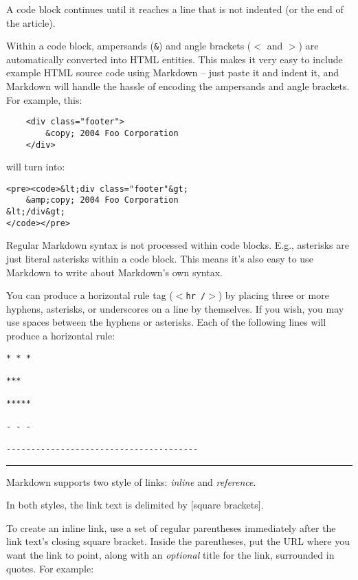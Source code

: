 A code block continues until it reaches a line that is not indented
(or the end of the article).

Within a code block, ampersands (\texttt{\&}) and angle brackets (\texttt{$<$} and \texttt{$>$})
are automatically converted into HTML entities. This makes it very
easy to include example HTML source code using Markdown -- just paste
it and indent it, and Markdown will handle the hassle of encoding the
ampersands and angle brackets. For example, this:

\begin{verbatim}
    <div class="footer">
        &copy; 2004 Foo Corporation
    </div>
\end{verbatim}

will turn into:

\begin{verbatim}
<pre><code>&lt;div class="footer"&gt;
    &amp;copy; 2004 Foo Corporation
&lt;/div&gt;
</code></pre>
\end{verbatim}

Regular Markdown syntax is not processed within code blocks. E.g.,
asterisks are just literal asterisks within a code block. This means
it's also easy to use Markdown to write about Markdown's own syntax.

You can produce a horizontal rule tag (\texttt{$<$hr \slash $>$}) by placing three or
more hyphens, asterisks, or underscores on a line by themselves. If you
wish, you may use spaces between the hyphens or asterisks. Each of the
following lines will produce a horizontal rule:

\begin{verbatim}
* * *

***

*****

- - -

---------------------------------------
\end{verbatim}

\begin{center}\rule{3in}{0.4pt}\end{center}

Markdown supports two style of links: \emph{inline} and \emph{reference}.

In both styles, the link text is delimited by [square brackets].

To create an inline link, use a set of regular parentheses immediately
after the link text's closing square bracket. Inside the parentheses,
put the URL where you want the link to point, along with an \emph{optional}
title for the link, surrounded in quotes. For example:


